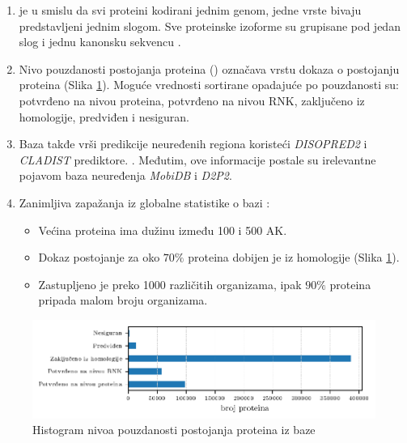 \begin{enumerate}
  \item
    \label{red}
    \swissprot je  u smislu da svi proteini
    kodirani jednim genom, jedne vrste bivaju predstavljeni jednim slogom. Sve
    proteinske izoforme su grupisane pod jedan slog i jednu kanonsku sekvencu \parencite{nonRedundant}.

  \item Nivo pouzdanosti postojanja proteina () 
    označava vrstu dokaza o postojanju proteina (Slika \ref{fig:PE}). Moguće
    vrednosti sortirane opadajuće po pouzdanosti su: potvrđeno na nivou
    proteina, potvrđeno na nivou RNK, zaključeno iz homologije, predviđen i
    nesiguran. 

  \clearpage


  \item
    Baza \swissprot takđe vrši predikcije neuređenih regiona koristeći \textit{DISOPRED2}
    i \textit{CLADIST} prediktore. \parencite{Meng_c2017}. Međutim, ove informacije
    postale su irelevantne pojavom baza neuređenja \textit{MobiDB}\parencite{Piovesan2017} i \textit{D2P2}\parencite{Oates2012}.

  \item Zanimljiva zapažanja iz globalne statistike o bazi \swissprot \cite{uniprot}:
    \begin{itemize}
      \item Većina proteina ima dužinu između 100 i 500 AK.
      \item Dokaz postojanje za oko $70\%$ proteina dobijen je iz homologije (Slika \ref{fig:PE}).
      \item Zastupljeno je preko 1000 različitih organizama, ipak
        $90\%$ proteina pripada malom broju organizama.
    \end{itemize}
      


\end{enumerate}

\begin{figure}[h!]
  \centering
  \hspace*{-0.2cm} 
  \includegraphics[]{plots/PE.pdf}
  \caption{Histogram nivoa pouzdanosti postojanja proteina iz baze \swissprot}
  \label{fig:PE}
\end{figure}

%
%
%













